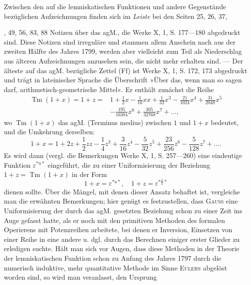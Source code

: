 \bigskip
\begin{center}\end{center}
\indent Zwischen den auf die lemniskatischen Funktionen und andere Gegenstände
bezüglichen Aufzeichnungen finden sich im \textit{Leiste} bei den Seiten 25, 26, 37,\par
\clearpage{}
, 49, 56, 83, 88 Notizen über das agM., die Werke X, 1, S. 177—180 abgedruckt
sind. Diese Notizen sind irreguläre und stammen allem Anschein
nach aus der zweiten Hälfte des Jahres 1799, werden aber vielleicht zum Teil
als Niederschlag aus älteren Aufzeichnungen anzusehen sein, die nicht mehr
erhalten sind. — Der älteste auf das agM. bezügliche Zettel (Ff) ist Werke
X, 1, S. 172, 173 abgedruckt und trägt in lateinischer Sprache die Überschrift
»Über das, wenn man so sagen darf, arithmetisch-geometrische Mittel«. Er
enthält zunächst die Reihe
\[
\begin{aligned}
\operatorname{Tm}(1+x)=1+z={}&1+\frac12x-\frac1{16}xx+\frac1{32}x^3-\frac{21}{1024}x^4+\frac{31}{2048}x^5\\
&-\frac{195}{16384}x^6+\frac{305}{32768}x^7+\ldots,
\end{aligned}
\]
wo \(\operatorname{Tm}(1+x)\) das agM. (Terminus medius) zwischen \(1\) und \(1+x\) bedeutet,
und die Umkehrung derselben:
\[
1+x=1+2z+\frac12zz-\frac14z^3+\frac3{16}z^4-\frac5{32}z^5+\frac{23}{256}z^6-\frac5{128}z^7+\ldots.
\]
Es wird dann (vergl. die Bemerkungen Werke X, 1, S. 257—260) eine eindeutige
Funktion \(\varepsilon^{*u*}\) eingeführt, die zu einer Uniformisierung der Beziehung
\(1+z=\operatorname{Tm}(1+x)\) in der Form
\[
1+x=\varepsilon^{*u*},\quad1+z=\varepsilon^{*\frac{u}{2}*}
\]
dienen sollte. Über die Mängel, mit denen dieser Ansatz behaftet ist, vergleiche
man die erwähnten Bemerkungen; hier genügt es festzustellen, dass
\textsc{Gauss} eine Uniformisierung der durch das agM. gesetzten Beziehung schon
zu einer Zeit ins Auge gefasst hatte, als er noch mit den primitiven Methoden
des formalen Operierens mit Potenzreihen arbeitete, bei denen er Inversion,
Einsetzen von einer Reihe in eine andere u. dgl. durch das Berechnen einiger
erster Glieder zu erledigen suchte. Hält man sich vor Augen, dass diese
Methoden in der Theorie der lemniskatischen Funktion schon zu Anfang des
Jahres 1797 durch die numerisch induktive, mehr quantitative Methode im
Sinne \textsc{Eulers} abgelöst worden sind, so wird man veranlasst, den Ursprung
